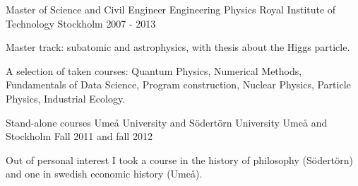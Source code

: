


\begin{cventries}

\cventry
{Master of Science and Civil Engineer Engineering Physics} %
{Royal Institute of Technology} %
{Stockholm} %
{2007 - 2013} %
{ %
\begin{cvitems}
\item {Master track: subatomic and astrophysics, with thesis about the Higgs particle.}
\item {A selection of taken courses: Quantum Physics, Numerical Methods, Fundamentals of Data Science, Program construction, Nuclear Physics, Particle Physics, Industrial Ecology.
}
\end{cvitems}
}

\cventry
{Stand-alone courses} %
{Ume{\aa} University and S{\"o}dert{\"o}rn University} %
{Ume{\aa} and Stockholm} %
{Fall 2011 and fall 2012} %
{ %
\begin{cvitems}
\item {Out of personal interest I took a course in the history of philosophy (S{\"o}dert{\"o}rn) and one in swedish economic history (Ume{\aa}).
}
\end{cvitems}
}

\end{cventries}